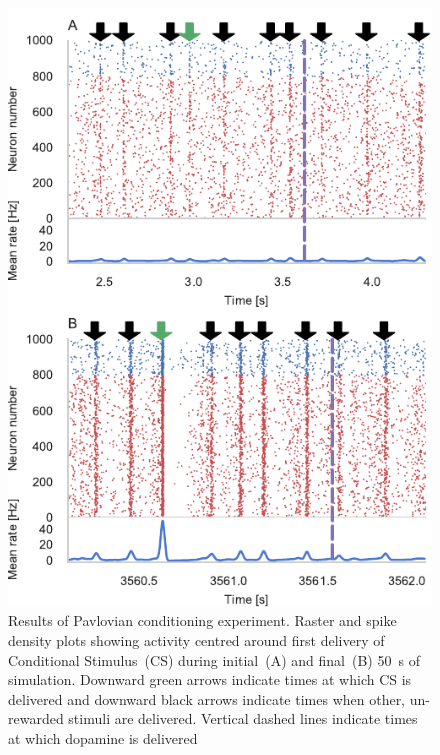 \documentclass[utf8]{frontiersSCNS} %
\begin{document}
\begin{figure}[t!]
    \begin{center}
        \includegraphics{figures/izhikevich_spikes.pdf}
    \end{center}
    \caption{Results of Pavlovian conditioning experiment.
             Raster and spike density plots showing activity centred around first delivery of Conditional Stimulus~(CS) during initial~(A) and final~(B) \SI{50}{\second} of simulation.
             Downward green arrows indicate times at which CS is delivered and downward black arrows indicate times when other, un-rewarded stimuli are delivered. 
             Vertical dashed lines indicate times at which dopamine is delivered}
    \label{fig:izhikevich_spikes}
\end{figure}
%
\end{document}
